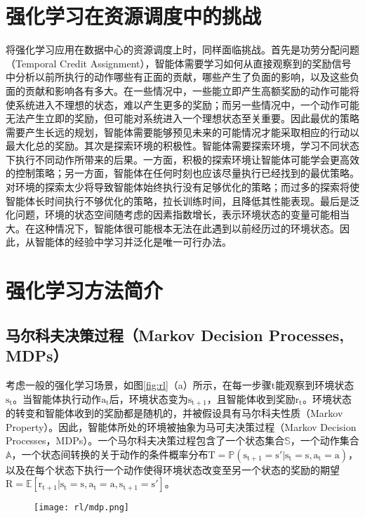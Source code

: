 \section{强化学习在资源调度中的挑战}
将强化学习应用在数据中心的资源调度上时，同样面临挑战。首先是功劳分配问题（Temporal Credit Assignment），智能体需要学习如何从直接观察到的奖励信号中分析以前所执行的动作哪些有正面的贡献，哪些产生了负面的影响，以及这些负面的贡献和影响各有多大。在一些情况中，一些能立即产生高额奖励的动作可能将使系统进入不理想的状态，难以产生更多的奖励；而另一些情况中，一个动作可能无法产生立即的奖励，但可能对系统进入一个理想状态至关重要。因此最优的策略需要产生长远的规划，智能体需要能够预见未来的可能情况才能采取相应的行动以最大化总的奖励。其次是探索环境的积极性。智能体需要探索环境，学习不同状态下执行不同动作所带来的后果。一方面，积极的探索环境让智能体可能学会更高效的控制策略；另一方面，智能体在任何时刻也应该尽量执行已经找到的最优策略。对环境的探索太少将导致智能体始终执行没有足够优化的策略；而过多的探索将使智能体长时间执行不够优化的策略，拉长训练时间，且降低其性能表现。最后是泛化问题，环境的状态空间随考虑的因素指数增长，表示环境状态的变量可能相当大。在这种情况下，智能体很可能根本无法在此遇到以前经历过的环境状态。因此，从智能体的经验中学习并泛化是唯一可行办法。

\section{强化学习方法简介}
\subsection{马尔科夫决策过程（Markov Decision Processes, MDPs）}
考虑一般的强化学习场景，如图\ref{fig:rl}（a）所示，在每一步骤$\mathrm{t}$能观察到环境状态$\mathrm{s_t}$。当智能体执行动作$\mathrm{a_t}$后，环境状态变为$\mathrm{s_{t+1}}$，且智能体收到奖励$\mathrm{r_t}$。环境状态的转变和智能体收到的奖励都是随机的，并被假设具有马尔科夫性质（Markov Property）。因此，智能体所处的环境被抽象为马可夫决策过程（Markov Decision Processes，MDPs）。一个马尔科夫决策过程包含了一个状态集合$\mathbb{S}$，一个动作集合$\mathbb{A}$，一个状态间转换的关于动作的条件概率分布$\mathrm{T=\mathbb{P}(s_{t+1}=s'|s_t=s, a_t = a)}$，以及在每个状态下执行一个动作使得环境状态改变至另一个状态的奖励的期望$\mathrm{R=\mathbb{E}[r_{t+1}|s_t=s, a_t=a, s_{t+1}=s']}$。

\begin{figure}
  \centering
  \begin{minipage}[b]{0.7\textwidth}
    \centering
    \texttt{[image: rl/mdp.png]}
    \label{fig:mdp}
  \end{minipage}     
\end{figure}


